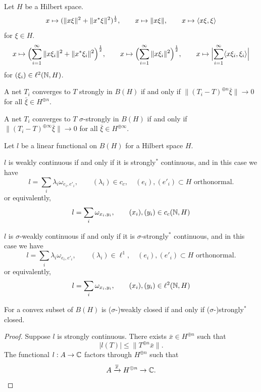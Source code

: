 \documentclass{../../large}
\begin{document}
\begin{prb}
Let $H$ be a Hilbert space.
\[x\mapsto(\|x\xi\|^2+\|x^*\xi\|^2)^{\frac12},\qquad
x\mapsto\|x\xi\|,\qquad
x\mapsto\langle x\xi,\xi\rangle\]
for $\xi\in H$.
\[x\mapsto\Bigl(\sum_{i=1}^\infty\|x\xi_i\|^2+\|x^*\xi_i\|^2\Bigr)^{\frac12},\qquad
x\mapsto\Bigl(\sum_{i=1}^\infty\|x\xi_i\|^2\Bigr)^{\frac12},\qquad
x\mapsto\Bigl|\sum_{i=1}^\infty\langle x\xi_i,\xi_i\rangle\Bigr|\]
for $(\xi_i)\in\ell^2(\mathbb{N},H)$.

\begin{parts}
\item
A net $T_i$ converges to $T$ strongly in $B(H)$ if and only if $\|(T_i-T)^{\oplus n}\bar\xi\|\to0$ for all $\bar\xi\in H^{\oplus n}$.
\item
A net $T_i$ converges to $T$ $\sigma$-strongly in $B(H)$ if and only if $\|(T_i-T)^{\oplus\infty}\bar\xi\|\to0$ for all $\bar\xi\in H^{\oplus\infty}$.
\end{parts}
\end{prb}


\begin{prb}
Let $l$ be a linear functional on $B(H)$ for a Hilbert space $H$.
\begin{parts}
\item
$l$ is weakly continuous if and only if it is strongly$^*$ continuous, and in this case we have
\[l=\sum_i\lambda_i\omega_{e_i,e'_i},\qquad(\lambda_i)\in c_c,\quad(e_i),(e'_i)\subset H\text{ orthonormal}.\]
or equivalently,
\[l=\sum_i\omega_{x_i,y_i},\qquad(x_i),(y_i)\in c_c(\mathbb{N},H)\]
\item
$l$ is $\sigma$-weakly continuous if and only if it is $\sigma$-strongly$^*$ continuous, and in this case we have 
\[l=\sum_i\lambda_i\omega_{e_i,e'_i},\qquad(\lambda_i)\in\ell^1,\quad(e_i),(e'_i)\subset H\text{ orthonormal}.\]
or equivalently,
\[l=\sum_i\omega_{x_i,y_i},\qquad(x_i),(y_i)\in\ell^2(\mathbb{N},H)\]
\item For a convex subset of $B(H)$ is ($\sigma$-)weakly closed if and only if ($\sigma$-)strongly$^*$ closed.
\end{parts}
\end{prb}
\begin{proof}
Suppose $l$ is strongly continuous.
There exists $\bar x\in H^{\oplus n}$ such that
\[|l(T)|\le\|T^{\oplus n}\bar x\|.\]
The functional $l:A\to\mathbb{C}$ factors through $H^{\oplus n}$ such that
\[A\xrightarrow{\overline x}H^{\oplus n}\to\mathbb{C}.\]
\end{proof}
\end{document}
